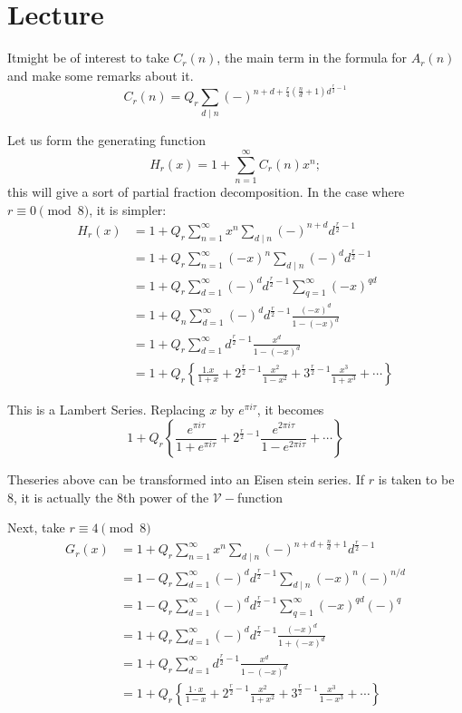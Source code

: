 \chapter{Lecture}\label{part4:lec41} %

It\pageoriginale might be of interest to take $C_{r}(n)$, the main
term in the formula for $A_{r}(n)$ and make some remarks about it.
$$
C_r(n) = Q_r \sum_{d\mid n} (-)^{n+d+ \frac{r}{4} \left(\frac{n}{d} +1
  \right) d^{\frac{r}{2}-1}}
$$

Let us form the generating function
$$
H_r (x) = 1 + \sum^\infty_{n=1} C_r (n) x^n;
$$
this will give a sort of partial fraction decomposition. In the case
where $r\equiv 0 \pmod{8}$, it is simpler:
\begin{align*}
  H_r (x) & = 1+ Q_r \sum^\infty_{n=1} x^n \sum_{d\mid n} (-)^{n+d}
  d^{\frac{r}{2}-1}\\
  & = 1+ Q_r \sum^\infty_{n=1} (-x)^n \sum_{d\mid n} (-)^d
  d^{\frac{r}{2}-1}\\
  & = 1+ Q_r \sum^\infty_{d=1} (-)^d d^{\frac{r}{2}-1}
  \sum^\infty_{q=1} (-x)^{qd}\\
  & = 1+ Q_n \sum^\infty_{d=1} (-)^d d^{\frac{r}{2}-1}
  \frac{(-x)^d}{1-(-x)^d}\\
  & = 1+ Q_r \sum^\infty_{d=1} d^{\frac{r}{2}-1}
  \frac{x^d}{1-(-x)^d}\\
  & = 1+ Q_r \left\{\frac{1. x}{1+x} + 2^{\frac{r}{2}-1}
  \frac{x^2}{1-x^2}+ 3^{\frac{r}{2}-1} \frac{x^3}{1+x^3} + \cdots  \right\}
\end{align*}

This is a Lambert Series. Replacing $x$ by $e^{\pi i \tau}$, it
becomes 
$$
1+ Q_r \left\{ \frac{e^{\pi i \tau}}{1+e^{\pi i \tau}}+
2^{\frac{r}{2}-1} \frac{e^{2 \pi i \tau}}{1- e^{2 \pi i \tau}} +
\cdots \right\}
$$

The\pageoriginale series above can be transformed into an Eisen stein series. If $r$ is
taken to be 8, it is actually the 8th power of the
$\mathscr{V}-$function 

Next, take $r \equiv 4 \pmod{8}$
\begin{align*}
  G_r(x) & = 1+ Q_r \sum^\infty_{n=1} x^n \sum_{d\mid n} (-)^{n+d+
    \frac{n}{d}+1} d^{\frac{r}{2}-1}\\
  & = 1- Q_r \sum^\infty_{d=1} (-)^d d^{\frac{r}{2}-1} \sum_{d\mid n}
  (-x)^n (-)^{n/d}\\
  & = 1- Q_r \sum^\infty_{d=1} (-)^d d^{\frac{r}{2}-1}
  \sum^\infty_{q=1} (-x)^{qd} (-)^q\\
  & = 1+ Q_r \sum^\infty_{d=1} (-)^d d^{\frac{r}{2}-1}
  \frac{(-x)^d}{1+(-x)^d}\\
  & = 1+ Q_r \sum^\infty_{d=1} d^{\frac{r}{2}-1} \frac{x^d}{1-
    (-x)^d}\\
  & = 1+ Q_r \left\{\frac{1 \cdot x}{1-x} + 2^{\frac{r}{2}-1}
  \frac{x^2}{1+x^2} + 3^{\frac{r}{2}-1} \frac{x^3}{1-x^3} + \cdots \right\}
\end{align*}

